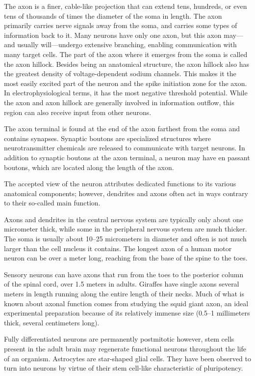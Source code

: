 The axon is a finer, cable-like projection that can extend tens, hundreds, or even tens of thousands of times the diameter of the soma in length. The axon primarily carries nerve signals away from the soma, and carries some types of information back to it. Many neurons have only one axon, but this axon may---and usually will---undergo extensive branching, enabling communication with many target cells. The part of the axon where it emerges from the soma is called the axon hillock. Besides being an anatomical structure, the axon hillock also has the greatest density of voltage-dependent sodium channels. This makes it the most easily excited part of the neuron and the spike initiation zone for the axon. In electrophysiological terms, it has the most negative threshold potential. While the axon and axon hillock are generally involved in information outflow, this region can also receive input from other neurons.

The axon terminal is found at the end of the axon farthest from the soma and contains synapses. Synaptic boutons are specialized structures where neurotransmitter chemicals are released to communicate with target neurons. In addition to synaptic boutons at the axon terminal, a neuron may have en passant boutons, which are located along the length of the axon.

The accepted view of the neuron attributes dedicated functions to its various anatomical components; however, dendrites and axons often act in ways contrary to their so-called main function.

Axons and dendrites in the central nervous system are typically only about one micrometer thick, while some in the peripheral nervous system are much thicker. The soma is usually about 10--25 micrometers in diameter and often is not much larger than the cell nucleus it contains. The longest axon of a human motor neuron can be over a meter long, reaching from the base of the spine to the toes.

Sensory neurons can have axons that run from the toes to the posterior column of the spinal cord, over 1.5 meters in adults. Giraffes have single axons several meters in length running along the entire length of their necks. Much of what is known about axonal function comes from studying the squid giant axon, an ideal experimental preparation because of its relatively immense size (0.5--1 millimeters thick, several centimeters long).

Fully differentiated neurons are permanently postmitotic however, stem cells present in the adult brain may regenerate functional neurons throughout the life of an organism. Astrocytes are star-shaped glial cells. They have been observed to turn into neurons by virtue of their stem cell-like characteristic of pluripotency.

